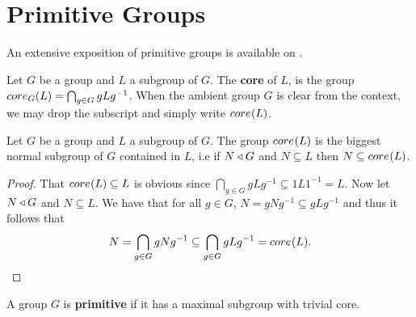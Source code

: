 \section{Primitive Groups}

An extensive exposition of primitive groups is available on \cite{Ballester-BolinchesCFG}.

\begin{definition}
    Let $G$ be a group and $L$ a subgroup of $G$. The \textbf{core} of $L$, is the group $\core[G]{L} = \bigcap_{g \in G} gLg^{-1}$. 
    When the ambient group $G$ is clear from the context, we may drop the subscript and simply write $\core{L}$. 
\end{definition}

\begin{theorem}
    Let $G$ be a group and $L$ a subgroup of $G$. The group $\core{L}$ is the biggest normal subgroup of $G$ contained in $L$, i.e if $N \nsub G$ and $N \subseteq L$ then $N \subseteq \core{L}$.
\end{theorem}

\begin{proof}
    That $\core{L} \subseteq L$ is obvious since $\bigcap_{g \in G} gLg^{-1} \subseteq 1L1^{-1} = L$. Now let $N \nsub G$ and $N \subseteq L$. We have that for all $g \in G$, $N = gNg^{-1} \subseteq gLg^{-1}$ and thus it follows that 
    $$
    N = \bigcap_{g \in G} gNg^{-1} \subseteq \bigcap_{g \in G} gLg^{-1} = \core{L}.
    $$
\end{proof}

\begin{definition}
    A group $G$ is \textbf{primitive} if it has a maximal subgroup with trivial core.
\end{definition}